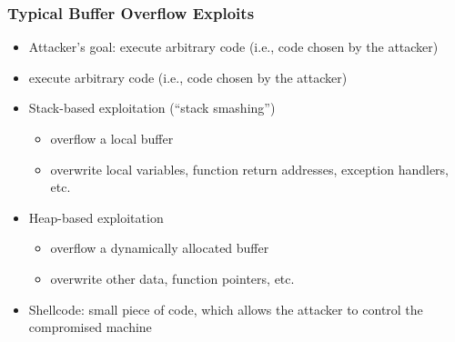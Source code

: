 \documentclass[final]{article}
\begin{document}
\subsubsection*{Typical Buffer Overflow Exploits}
\begin{itemize}[nosep]
    \item Attacker’s goal: execute arbitrary code (i.e., code chosen by the attacker)
    \item execute arbitrary code (i.e., code chosen by the attacker)
    \item Stack-based exploitation (“stack smashing”)
          \begin{itemize}[nosep]
              \item overflow a local buffer
              \item overwrite local variables, function return addresses, exception handlers, etc.
          \end{itemize}
    \item Heap-based exploitation
          \begin{itemize}
              \item overflow a dynamically allocated buffer
              \item overwrite other data, function pointers, etc.
          \end{itemize}
    \item Shellcode: small piece of code, which allows the attacker to control the compromised machine
\end{itemize}
\end{document}
